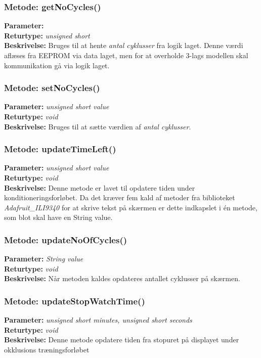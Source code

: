 \subsubsection{Metode: getNoCycles()}
\textbf{Parameter: } 
\\ \textbf{Returtype: } \textit{unsigned short}
\\ \textbf{Beskrivelse: } Bruges til at hente \textit{antal cyklusser} fra logik laget. Denne værdi aflæses fra EEPROM via data laget, men for at overholde 3-lags modellen skal kommunikation gå via logik laget. 

\subsubsection{Metode: setNoCycles()}
\textbf{Parameter: } \textit{unsigned short value}
\\ \textbf{Returtype: } \textit{void}
\\ \textbf{Beskrivelse: } Bruges til at sætte værdien af \textit{antal cyklusser}. 

\subsubsection{Metode: updateTimeLeft()}
\textbf{Parameter: } \textit{unsigned short value}
\\ \textbf{Returtype: } \textit{void}
\\ \textbf{Beskrivelse: } Denne metode er lavet til opdatere tiden under konditioneringsforløbet. Da det kræver fem kald af metoder fra biblioteket \textit{Adafruit\_ILI9340} for at skrive tekst på skærmen er dette indkapslet i én metode, som blot skal have en String value. 

\subsubsection{Metode: updateNoOfCycles()}
\textbf{Parameter: } \textit{String value}
\\ \textbf{Returtype: } \textit{void}
\\ \textbf{Beskrivelse: } Når metoden kaldes opdateres antallet cyklusser på skærmen. 

\subsubsection{Metode: updateStopWatchTime()}
\textbf{Parameter: } \textit{unsigned short minutes, unsigned short seconds}
\\ \textbf{Returtype: } \textit{void}
\\ \textbf{Beskrivelse: } Denne metode opdatere tiden fra stopuret på displayet under okklusions træningsforløbet 

